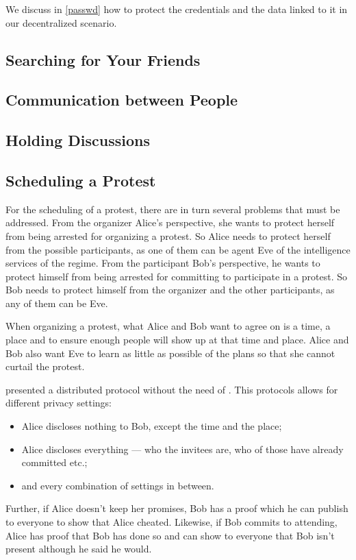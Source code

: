 We discuss in \cref{passwd} how to protect the credentials and the data linked to 
it in our decentralized scenario.

\subsection{Searching for Your Friends}
\label{UserSearch}





\subsection{Communication between People}
\label{Communicating}



\subsection{Holding Discussions}
\label{Discussions}



\subsection{Scheduling a Protest}
\label{Scheduling}

For the scheduling of a protest, there are in turn several problems that must 
be addressed.
From the organizer Alice's perspective, she wants to protect herself from being 
arrested for organizing a protest.
So Alice needs to protect herself from the possible participants, as one of 
them can be agent Eve of the intelligence services of the regime.
From the participant Bob's perspective, he wants to protect himself from being 
arrested for committing to participate in a protest.
So Bob needs to protect himself from the organizer and the other participants, 
as any of them can be Eve.

When organizing a protest, what Alice and Bob want to agree on is a time, 
a place and to ensure enough people will show up at that time and place.
Alice and Bob also want Eve to learn as little as possible of the plans so 
that she cannot curtail the protest.

\citet{EventsInvitations} presented a distributed protocol without the need of 
.
This protocols allows for different privacy settings:
\begin{itemize}
\item Alice discloses nothing to Bob, except the time and the place;
\item Alice discloses everything --- who the invitees are, who of those have 
  already committed etc.;
\item and every combination of settings in between.
\end{itemize}
Further, if Alice doesn't keep her promises, Bob has a proof which he can 
publish to everyone to show that Alice cheated.
Likewise, if Bob commits to attending, Alice has proof that Bob has done so and 
can show to everyone that Bob isn't present although he said he would.

